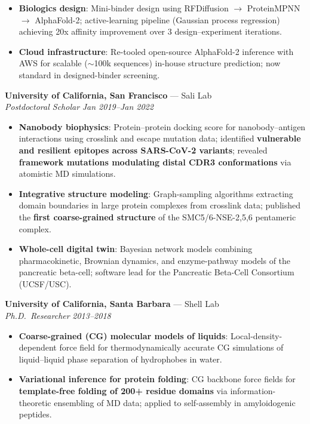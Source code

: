 \documentclass[9pt, letterpaper]{article}
\newcommand{\employer}[1]{\textbf{\color{accent}#1}}
\newcommand{\jobtitle}[1]{\textit{#1}}
\newcommand{\daterange}[1]{\textit{\color{muted}#1}}
\newcommand{\jobheader}[3]{%
  \employer{#1} --- \textcolor{muted}{#2} \\[2pt]
  #3\par
}
\newcommand{\roletime}[2]{%
  \jobtitle{#1} \hfill \daterange{#2}\par\vspace{1pt}
}
\begin{document}
{\begin{itemize}
  \item \textbf{Biologics design}: Mini-binder design using RFDiffusion $\to$ ProteinMPNN $\to$ AlphaFold-2; active-learning pipeline (Gaussian process regression) achieving 20x affinity improvement over 3 design--experiment iterations.

  \item \textbf{Cloud infrastructure}: Re-tooled open-source AlphaFold-2 inference with AWS for scalable (${\sim}$100k sequences) in-house structure prediction; now standard in designed-binder screening.
\end{itemize}

\vspace{6pt}
\jobheader{University of California, San Francisco}{Sali Lab}{%
  \roletime{Postdoctoral Scholar}{Jan 2019--Jan 2022}
}
\begin{itemize}
  \item \textbf{Nanobody biophysics}: Protein--protein docking score for nanobody--antigen interactions using crosslink and escape mutation data; identified \textbf{vulnerable and resilient epitopes across SARS-CoV-2 variants}; revealed \textbf{framework mutations modulating distal CDR3 conformations} via atomistic MD simulations.

  \item \textbf{Integrative structure modeling}: Graph-sampling algorithms extracting domain boundaries in large protein complexes from crosslink data; published the \textbf{first coarse-grained structure }of the SMC5/6-NSE-{2,5,6} pentameric complex.

  \item \textbf{Whole-cell digital twin}: Bayesian network models combining pharmacokinetic, Brownian dynamics, and enzyme-pathway models of the pancreatic beta-cell; software lead for the Pancreatic Beta-Cell Consortium (UCSF/USC).
\end{itemize}

\vspace{6pt}
\jobheader{University of California, Santa Barbara}{Shell Lab}{%
  \roletime{Ph.D.\ Researcher}{2013--2018}
}
\begin{itemize}
  \item \textbf{Coarse-grained (CG) molecular models of liquids}: Local-density-dependent force field for thermodynamically accurate CG simulations of liquid--liquid phase separation of hydrophobes in water.

  \item \textbf{Variational inference for protein folding}: CG backbone force fields for \textbf{template-free folding of 200+ residue domains} via information-theoretic ensembling of MD data; applied to self-assembly in amyloidogenic peptides.
\end{itemize}

}
\end{document}
